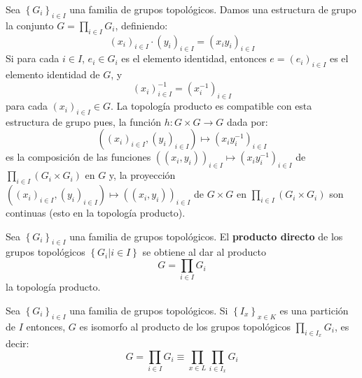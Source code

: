 \documentclass[12pt]{report}
\theoremstyle{largebreak}
\newcommand{\cf}[3]{\ensuremath{#1:#2\rightarrow#3}}
\begin{document}
    Sea $\left\{G_i \right\}_{i\in I}$ una familia de grupos topológicos. Damos una estructura de grupo la conjunto $G=\prod_{i\in I}G_i$, definiendo:
    \begin{equation*}
        \left(x_i\right)_{ i\in I}\cdot\left(y_i\right)_{ i\in I}=\left(x_iy_i\right)_{ i\in I}
    \end{equation*}
    Si para cada $i\in I$, $e_i\in G_i$ es el elemento identidad, entonces $e=\left(e_i \right)_{ i\in I}$ es el elemento identidad de $G$, y 
    \begin{equation*}
        \left(x_i\right)_{ i\in I}^{-1}=\left(x_i^{-1}\right)_{ i\in I}
    \end{equation*}
    para cada $\left(x_i\right)_{ i\in I}\in G$. La topología producto es compatible con esta estructura de grupo pues, la función $\cf{h}{G\times G}{G}$ dada por:
    \begin{equation*}
        \left(\left(x_i\right)_{ i\in I},\left(y_i\right)_{ i\in I} \right)\mapsto \left(x_iy_i^{-1}\right)_{ i\in I}
    \end{equation*}
    es la composición de las funciones $\left((x_i,y_i)\right)_{i\in I}\mapsto \left(x_iy_i^{-1}\right)_{ i\in I}$ de $\prod_{ i\in I}\left(G_i\times G_i \right)$ en $G$ y, la proyección $\left(\left(x_i\right)_{ i\in I},\left(y_i\right)_{ i\in I}\right)\mapsto\left(\left(x_i,y_i\right) \right)_{i\in I}$ de $G\times G$ en $\prod_{ i\in I}\left(G_i\times G_i \right)$ son continuas (esto en la topología producto).

    \begin{mydef}
        Sea $\left\{G_i \right\}_{i\in I}$ una familia de grupos topológicos. El \textbf{producto directo} de los grupos topológicos $\left\{G_i\Big|i\in I \right\}$ se obtiene al dar al producto
        \begin{equation*}
            G=\prod_{i\in I}G_i
        \end{equation*}
        la topología producto.
    \end{mydef}

    \begin{propo}
        Sea $\left\{G_i \right\}_{i\in I}$ una familia de grupos topológicos. Si $\left\{I_x \right\}_{x\in K}$ es una partición de $I$ entonces, $G$ es isomorfo al producto de los grupos topológicos $\prod_{i\in I_x}G_i$, es decir:
        \begin{equation*}
            G=\prod_{i\in I}G_i\equiv\prod_{x\in L}\prod_{i\in I_x}G_i
        \end{equation*}
    \end{propo}
\end{document}
